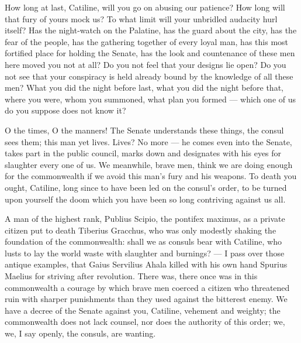
 How long at last, Catiline, will you go on abusing our patience? How long will that fury of yours mock us? To what limit will your unbridled audacity hurl itself? Has the night-watch on the Palatine, has the guard about the city, has the fear of the people, has the gathering together of every loyal man, has this most fortified place for holding the Senate, has the look and countenance of these men here moved you not at all? Do you not feel that your designs lie open? Do you not see that your conspiracy is held already bound by the knowledge of all these men? What you did the night before last, what you did the night before that, where you were, whom you summoned, what plan you formed --- which one of us do you suppose does not know it?

 O the times, O the manners! The Senate understands these things, the consul sees them; this man yet lives. Lives? No more --- he comes even into the Senate, takes part in the public council, marks down and designates with his eyes for slaughter every one of us. We meanwhile, brave men, think we are doing enough for the commonwealth if we avoid this man's fury and his weapons. To death you ought, Catiline, long since to have been led on the consul's order, to be turned upon yourself the doom which you have been so long contriving against us all.

 A man of the highest rank, Publius Scipio, the pontifex maximus, as a private citizen put to death Tiberius Gracchus, who was only modestly shaking the foundation of the commonwealth: shall we as consuls bear with Catiline, who lusts to lay the world waste with slaughter and burnings? --- I pass over those antique examples, that Gaius Servilius Ahala killed with his own hand Spurius Maelius for striving after revolution. There was, there once was in this commonwealth a courage by which brave men coerced a citizen who threatened ruin with sharper punishments than they used against the bitterest enemy. We have a decree of the Senate against you, Catiline, vehement and weighty; the commonwealth does not lack counsel, nor does the authority of this order; we, we, I say openly, the consuls, are wanting.

